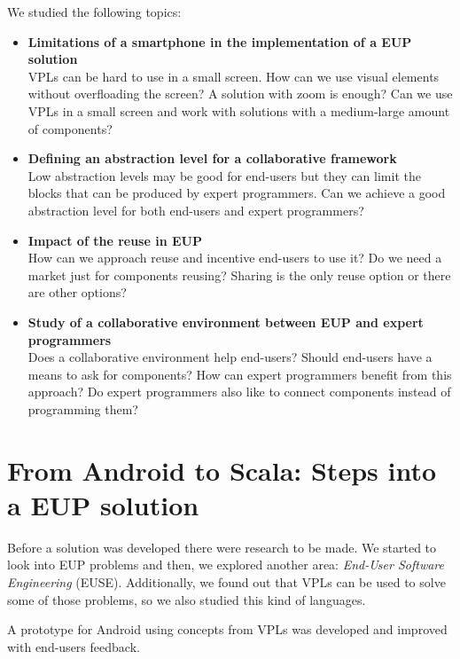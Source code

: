 \documentclass[9pt,a4paper]{extarticle}
\begin{document}
\begin{multicols}{2}
We studied the following topics: 

\begin{itemize}
	\item{\textbf{Limitations of a smartphone in the implementation of a EUP solution} \\
    VPLs can be hard to use in a small screen. How can we use visual elements without overfloading the screen? A solution with zoom is enough?
	Can we use VPLs in a small screen and work with solutions with a medium-large amount of components?}
	
	\item{\textbf{Defining an abstraction level for a collaborative framework} \\
	Low abstraction levels may be good for end-users but they can limit the blocks that can be produced by expert programmers.
	Can we achieve a good abstraction level for both end-users and expert programmers?}
  
	\item{\textbf{Impact of the reuse in EUP} \\
    How can we approach reuse and incentive end-users to use it?
    Do we need a market just for components reusing? 
	Sharing is the only reuse option or there are other options?}
	
	\item{\textbf{Study of a collaborative environment between EUP and expert programmers} \\
    Does a collaborative environment help end-users? Should end-users have a means to ask for components? 
    How can expert programmers benefit from this approach? 
    Do expert programmers also like to connect components instead of programming them?}
\end{itemize}


\section{From Android to Scala: Steps into a EUP solution}\label{sec:work}

Before a solution was developed there were research to be made. We started to look into EUP problems \cite{Barriers2004} and then, we explored another area: \emph{End-User Software Engineering} (EUSE).
Additionally, we found out that VPLs can be used to solve some of those problems, so we also studied this kind of languages.

A prototype for Android using concepts from VPLs was developed and improved with end-users feedback. 


\end{multicols}
\end{document}
